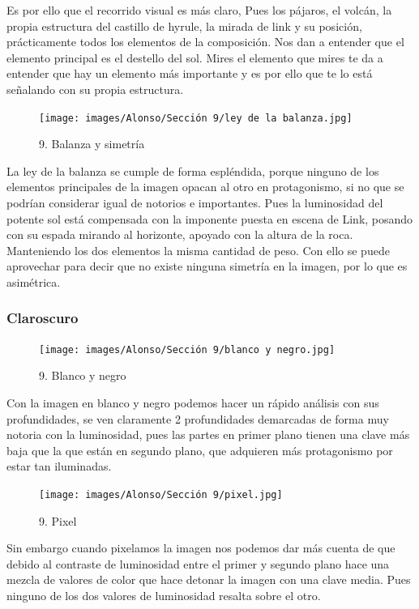 \documentclass[12pt]{article}
\begin{document}
    Es por ello que el recorrido visual es más claro, Pues los pájaros, el volcán, la propia estructura del castillo de hyrule, la mirada de link y su posición, prácticamente todos los elementos de la composición. Nos dan a entender que el elemento principal es el destello del sol. Mires el elemento que mires te da a entender que hay un elemento más importante y es por ello que te lo está señalando con su propia estructura.

    \begin{figure}[H]
      \centering
      \texttt{[image: images/Alonso/Sección 9/ley de la balanza.jpg]}
      \caption{\small 9. Balanza y simetría}
    \end{figure}

    La ley de la balanza se cumple de forma espléndida, porque ninguno de los elementos principales de la imagen opacan al otro en protagonismo, si no que se podrían considerar igual de notorios e importantes. Pues la luminosidad del potente sol está compensada con la imponente puesta en escena de Link, posando con su espada mirando al horizonte, apoyado con la altura de la roca. Manteniendo los dos elementos la misma cantidad de peso. Con ello se puede aprovechar para decir que no existe ninguna simetría en la imagen, por lo que es asimétrica.

        \subsubsection{Claroscuro}

    \begin{figure}[H]
      \centering
      \texttt{[image: images/Alonso/Sección 9/blanco y negro.jpg]}
      \caption{\small 9. Blanco y negro}
    \end{figure}
    Con la imagen en blanco y negro podemos hacer un rápido análisis con sus profundidades, se ven claramente 2 profundidades demarcadas de forma muy notoria con la luminosidad, pues las partes en primer plano tienen una clave más baja que la que están en segundo plano, que adquieren más protagonismo por estar tan iluminadas.

    \begin{figure}[H]
      \centering
      \texttt{[image: images/Alonso/Sección 9/pixel.jpg]}
      \caption{\small 9. Pixel}
    \end{figure}

    Sin embargo cuando pixelamos la imagen nos podemos dar más cuenta de que debido al contraste de luminosidad entre el primer y segundo plano hace una mezcla de valores de color que hace detonar la imagen con una clave media. Pues ninguno de los dos valores de luminosidad resalta sobre el otro.
\end{document}
